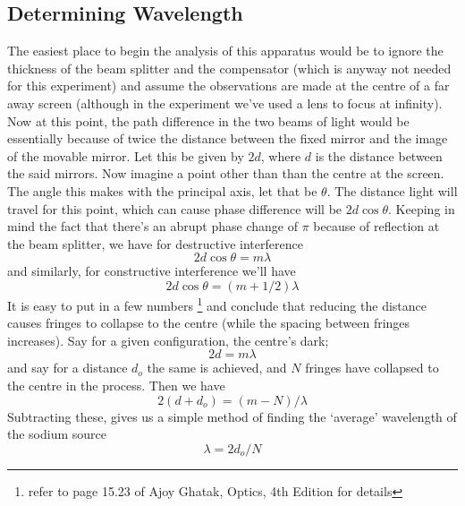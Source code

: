 	\subsection{Determining Wavelength}
		The easiest place to begin the analysis of this apparatus would be to ignore the thickness of the beam splitter and the compensator (which is anyway not needed for this experiment) and assume the observations are made at the centre of a far away screen (although in the experiment we've used a lens to focus at infinity). Now at this point, the path difference in the two beams of light would be essentially because of twice the distance between the fixed mirror and the image of the movable mirror. Let this be given by $2d$, where $d$ is the distance between the said mirrors. Now imagine a point other than than the centre at the screen. The angle this makes with the principal axis, let that be $\theta$. The distance light will travel for this point, which can cause phase difference will be $2d \cos{\theta}$. Keeping in mind the fact that there's an abrupt phase change of $\pi$ because of reflection at the beam splitter, we have for destructive interference
		\begin{equation}
			2d\cos{\theta}=m\lambda
		\end{equation}
		and similarly, for constructive interference we'll have
		\begin{equation}
			2d\cos{\theta}=(m+1/2)\lambda
		\end{equation}
		It is easy to put in a few numbers \footnote{refer to page 15.23 of Ajoy Ghatak, Optics, 4th Edition for details} and conclude that reducing the distance causes fringes to collapse to the centre (while the spacing between fringes increases). Say for a given configuration, the centre's dark;
		\begin{equation}
			2d=m\lambda
		\end{equation}
		and say for a distance $d_o$ the same is achieved, and $N$ fringes have collapsed to the centre in the process. Then we have
		\begin{equation}
			2(d+d_o)=(m-N)/\lambda
		\end{equation}
		Subtracting these, gives us a simple method of finding the `average' wavelength of the sodium source
		\begin{equation}
			\lambda=2d_o/N
			\label{5_eq1}
		\end{equation}


